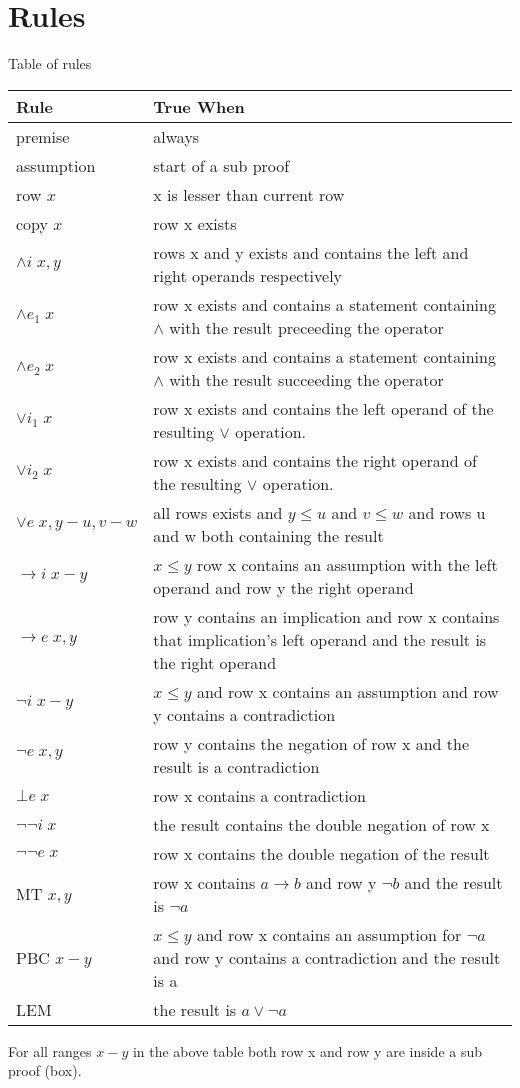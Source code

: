 \documentclass[a4paper,11pt]{article}
\begin{document}
\section{Rules}
Table of rules
\begin{center}
    \begin{longtable}{ l p{10cm}}
    \hline
    \textbf{Rule} & \textbf{True When}\\ \hline
    premise & always \\ \hline
    assumption & start of a sub proof \\ \hline
    row $x$ & x is lesser than current row \\ \hline
    copy $x$ & row x exists \\ \hline
    $\land i \; x,y$ & rows x and y exists and contains the left and right operands respectively \\ \hline
    $\land e_1 \; x$ & row x exists and contains a statement containing $\land$ with the result preceeding the operator \\ \hline
	$\land e_2 \; x$ & row x exists and contains a statement containing $\land$ with the result succeeding the operator \\ \hline
	$\lor i_1 \; x$ & row x exists and contains the left operand of the resulting $\lor$ operation. \\ \hline
	$\lor i_2 \; x$ & row x exists and contains the right operand of the resulting $\lor$ operation. \\ \hline
	$\lor e \; x,y-u,v-w$ & all rows exists and $y \leq u$ and $v \leq w$ and rows u and w both containing the result \\ \hline
	$\to i \; x-y$ & $x \leq y$ row x contains an assumption with the left operand and row y the right operand \\ \hline
	$\to e \; x,y$ & row y contains an implication and row x contains that implication's left operand and the result is the right operand \\ \hline
	$\neg i \; x-y$ & $x \leq y$ and row x contains an assumption and row y contains a contradiction \\ \hline
	$\neg e \; x,y$ & row y contains the negation of row x and the result is a contradiction \\ \hline
	$\bot e \; x$ & row x contains a contradiction \\ \hline
	$\neg \neg i \; x$ & the result contains the double negation of row x \\ \hline
	$\neg \neg e \; x$ & row x contains the double negation of the result \\ \hline
	MT $x,y$ & row x contains $a \to b$ and row y $\neg b$ and the result is $\neg a$ \\ \hline
	PBC $x-y$ & $x \leq y$ and row x contains an assumption for $\neg a$ and row y contains a contradiction and the result is a \\ \hline
	LEM & the result is $a \lor \neg a$ \\ \hline
    \end{longtable}
\end{center}
For all ranges $x-y$ in the above table both row x and row y are inside a sub proof (box).
\end{document}
